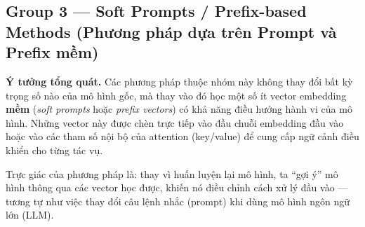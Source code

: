 \subsection{Group 3 — Soft Prompts / Prefix-based Methods (Phương pháp dựa trên Prompt và Prefix mềm)}
\label{ssec:soft_prompts}

\textbf{Ý tưởng tổng quát.}  
Các phương pháp thuộc nhóm này không thay đổi bất kỳ trọng số nào của mô hình gốc, mà thay vào đó học một số ít vector embedding \textbf{mềm} (\textit{soft prompts} hoặc \textit{prefix vectors}) có khả năng điều hướng hành vi của mô hình.  
Những vector này được chèn trực tiếp vào đầu chuỗi embedding đầu vào hoặc vào các tham số nội bộ của attention (key/value) để cung cấp ngữ cảnh điều khiển cho từng tác vụ.

Trực giác của phương pháp là: thay vì huấn luyện lại mô hình, ta “gợi ý” mô hình thông qua các vector học được, khiến nó điều chỉnh cách xử lý đầu vào — tương tự như việc thay đổi câu lệnh nhắc (prompt) khi dùng mô hình ngôn ngữ lớn (LLM).

